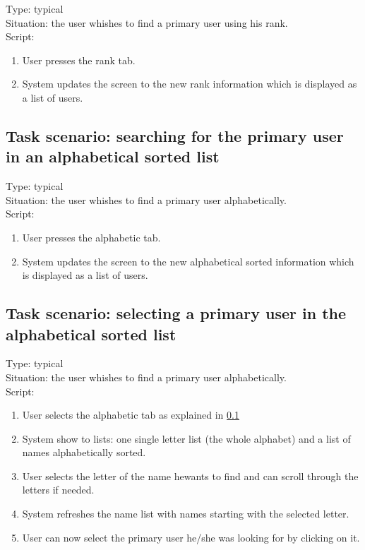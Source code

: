 \documentclass[11pt, a4paper,svglistings]{report}
\begin{document}
\label{subsec:rank}Type: typical \\
Situation: the user whishes to find a primary user using his rank. \\
Script:
\begin{enumerate}
\item User presses the rank tab.
\item System updates the screen to the new rank information which is displayed as a list of users.
\end{enumerate}


\subsection{Task scenario: searching for the primary user in an alphabetical sorted list}


\label{subsec:alphabetic}Type: typical \\
Situation: the user whishes to find a primary user alphabetically. \\
Script:
\begin{enumerate}
\item User presses the alphabetic tab.
\item System updates the screen to the new alphabetical sorted information which is displayed as a list of users.
\end{enumerate}


\subsection{Task scenario: selecting a primary user in the alphabetical sorted list}


\label{subsec:alphabeticSelect}Type: typical \\
Situation: the user whishes to find a primary user alphabetically. \\
Script:
\begin{enumerate}
\item User selects the alphabetic tab as explained in \ref{subsec:alphabetic}
\item System show to lists: one single letter list (the whole alphabet) and a list of names alphabetically sorted.
\item User selects the letter of the name hewants to find and can scroll through the letters if needed.
\item System refreshes the name list with names starting with the selected letter.
\item User can now select the primary user he/she was looking for by clicking on it.
\end{enumerate}
\end{document}
